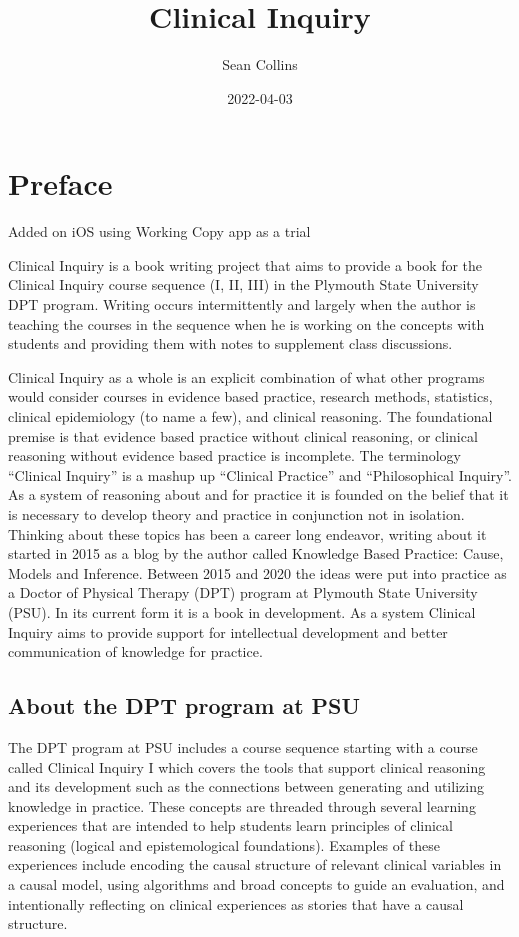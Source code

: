 \documentclass[
]{book}
\title{Clinical Inquiry}
\author{Sean Collins}
\date{2022-04-03}
\begin{document}
\maketitle

{
\setcounter{tocdepth}{1}
\tableofcontents
}
\hypertarget{preface}{%
\chapter*{Preface}\label{preface}}

Added on iOS using Working Copy app as a trial

Clinical Inquiry is a book writing project that aims to provide a book for the Clinical Inquiry course sequence (I, II, III) in the Plymouth State University DPT program. Writing occurs intermittently and largely when the author is teaching the courses in the sequence when he is working on the concepts with students and providing them with notes to supplement class discussions.

Clinical Inquiry as a whole is an explicit combination of what other programs would consider courses in evidence based practice, research methods, statistics, clinical epidemiology (to name a few), and clinical reasoning. The foundational premise is that evidence based practice without clinical reasoning, or clinical reasoning without evidence based practice is incomplete. The terminology ``Clinical Inquiry'' is a mashup up ``Clinical Practice'' and ``Philosophical Inquiry''. As a system of reasoning about and for practice it is founded on the belief that it is necessary to develop theory and practice in conjunction not in isolation. Thinking about these topics has been a career long endeavor, writing about it started in 2015 as a blog by the author called Knowledge Based Practice: Cause, Models and Inference. Between 2015 and 2020 the ideas were put into practice as a Doctor of Physical Therapy (DPT) program at Plymouth State University (PSU). In its current form it is a book in development. As a system Clinical Inquiry aims to provide support for intellectual development and better communication of knowledge for practice.

\hypertarget{about-the-dpt-program-at-psu}{%
\section{About the DPT program at PSU}\label{about-the-dpt-program-at-psu}}

The DPT program at PSU includes a course sequence starting with a course called Clinical Inquiry I which covers the tools that support clinical reasoning and its development such as the connections between generating and utilizing knowledge in practice. These concepts are threaded through several learning experiences that are intended to help students learn principles of clinical reasoning (logical and epistemological foundations). Examples of these experiences include encoding the causal structure of relevant clinical variables in a causal model, using algorithms and broad concepts to guide an evaluation, and intentionally reflecting on clinical experiences as stories that have a causal structure.
\end{document}
